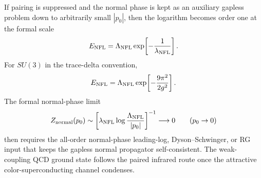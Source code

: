\begin{remark}
If pairing is suppressed and the normal phase is kept as an auxiliary
gapless problem down to arbitrarily small \(|p_0|\), then the logarithm becomes
order one at the formal scale
\begin{equation}
  E_{\rm NFL}
  =
  \Lambda_{\rm NFL}
  \exp\!\left[-\frac{1}{\lambda_{\rm NFL}}\right].
  \label{eq:qcd-formal-nfl-scale}
\end{equation}
For \(SU(3)\) in the trace-delta convention,
\begin{equation}
  E_{\rm NFL}
  =
  \Lambda_{\rm NFL}
  \exp\!\left[-\frac{9\pi^2}{2g^2}\right].
  \label{eq:qcd-formal-nfl-scale-su3}
\end{equation}
The formal normal-phase limit
\begin{equation}
  Z_{\rm normal}(p_0)
  \sim
  \left[
    \lambda_{\rm NFL}\log\frac{\Lambda_{\rm NFL}}{|p_0|}
  \right]^{-1}
  \longrightarrow0
  \qquad (p_0\to0)
  \label{eq:qcd-nfl-residue-limit}
\end{equation}
then requires the all-order normal-phase leading-log, Dyson--Schwinger, or RG
input that keeps the gapless normal propagator self-consistent.  The
weak-coupling QCD ground state follows the paired infrared route once the
attractive color-superconducting channel condenses.
\end{remark}

